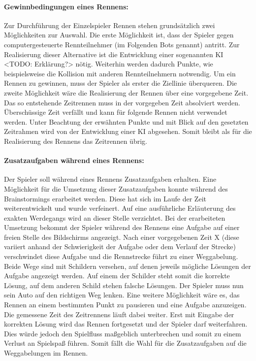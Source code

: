 		\paragraph{Gewinnbedingungen eines Rennens:}
		Zur Durchführung der Einzelspieler Rennen stehen grundsätzlich zwei Möglichkeiten zur Auswahl. Die erste Möglichkeit ist, dass der Spieler gegen computergesteuerte Rennteilnehmer (im Folgenden Bots genannt) antritt. Zur Realisierung dieser Alternative ist die Entwicklung einer sogenannten KI <TODO: Erklärung?> nötig. Weiterhin werden dadurch Punkte, wie beispielsweise die Kollision mit anderen Rennteilnehmern notwendig. Um ein Rennen zu gewinnen, muss der Spieler als erster die Ziellinie überqueren.
		Die zweite Möglichkeit wäre die Realisierung der Rennen über eine vorgegebene Zeit. Das so entstehende Zeitrennen muss in der vorgegeben Zeit absolviert werden. Überschüssige Zeit verfällt und kann für folgende Rennen nicht verwendet werden.
		Unter Beachtung der erwähnten Punkte und mit Blick auf den gesetzten Zeitrahmen wird von der Entwicklung einer KI abgesehen. Somit bleibt als für die Realisierung des Rennens das Zeitrennen übrig.

		\paragraph{Zusatzaufgaben während eines Rennens:}
		Der Spieler soll während eines Rennens Zusatzaufgaben erhalten. Eine Möglichkeit für die Umsetzung dieser Zusatzaufgaben konnte während des Brainstormings erarbeitet werden. Diese hat sich im Laufe der Zeit weiterentwickelt und wurde verfeinert. Auf eine ausführliche Erläuterung des exakten Werdegangs wird an dieser Stelle verzichtet.
		Bei der erarbeiteten Umsetzung bekommt der Spieler während des Rennens eine Aufgabe auf einer freien Stelle des Bildschirms angezeigt. Nach einer vorgegebenen Zeit X (diese variiert anhand der Schwierigkeit der Aufgabe oder dem Verlauf der Strecke) verschwindet diese Aufgabe und die Rennstrecke führt zu einer Weggabelung. Beide Wege sind mit Schildern versehen, auf denen jeweils mögliche Lösungen der Aufgabe angezeigt werden. Auf einem der Schilder steht somit die korrekte Lösung, auf dem anderen Schild stehen falsche Lösungen. Der Spieler muss nun sein Auto auf den richtigen Weg lenken.
		Eine weitere Möglichkeit wäre es, das Rennen an einem bestimmten Punkt zu pausieren und eine Aufgabe anzuzeigen. Die gemessene Zeit des Zeitrennens läuft dabei weiter. Erst mit Eingabe der korrekten Lösung wird das Rennen fortgesetzt und der Spieler darf weiterfahren. Dies würde jedoch den Spielfluss maßgeblich unterbrechen und somit zu einem Verlust an Spielspaß führen. Somit fällt die Wahl für die Zusatzaufgaben auf die Weggabelungen im Rennen.

